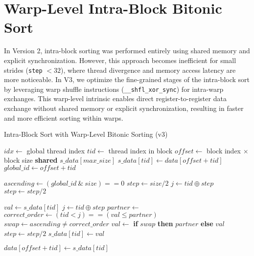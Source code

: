 \documentclass{article}
\begin{document}
\section{Warp-Level Intra-Block Bitonic Sort}

In Version 2, intra-block sorting was performed entirely using shared memory and explicit synchronization. 
However, this approach becomes inefficient for small strides (\texttt{step} $< 32$), where thread divergence 
and memory access latency are more noticeable. In V3, we optimize the fine-grained stages of the intra-block sort 
by leveraging warp shuffle instructions (\texttt{\_\_shfl\_xor\_sync}) for intra-warp exchanges. This warp-level 
intrinsic enables direct register-to-register data exchange without shared memory or explicit synchronization, 
resulting in faster and more efficient sorting within warps.

\begin{algorithm}[H]
\caption{Intra-Block Sort with Warp-Level Bitonic Sorting (v3)}
\begin{algorithmic}[1]
    \State $idx \gets$ global thread index
     \Return \EndIf
    \State $tid \gets$ thread index in block
    \State $offset \gets$ block index $\times$ block size
    \State \textbf{shared} $s\_data[max\_size]$
    \State $s\_data[tid] \gets data[offset + tid]$
    \State {}
    \State $global\_id \gets offset + tid$

        \State $ascending \gets (global\_id \ \&\ size) == 0$
        \State $step \gets size / 2$
            \State $j \gets tid \oplus step$
                \State {}
            \EndIf
            \State {}
            \State $step \gets step / 2$
        \EndWhile

        \State $val \gets s\_data[tid]$
            \State $j \gets tid \oplus step$
            \State $partner \gets$ 
            \State $correct\_order \gets (tid < j) == (val \leq partner)$
            \State $swap \gets ascending \ne correct\_order$
            \State $val \gets$ \textbf{if} $swap$ \textbf{then} $partner$ \textbf{else} $val$
            \State $step \gets step / 2$
        \EndWhile
        \State $s\_data[tid] \gets val$
        \State {}
    \EndFor

    \State $data[offset + tid] \gets s\_data[tid]$
\EndProcedure
\end{algorithmic}
\end{algorithm}
\end{document}
